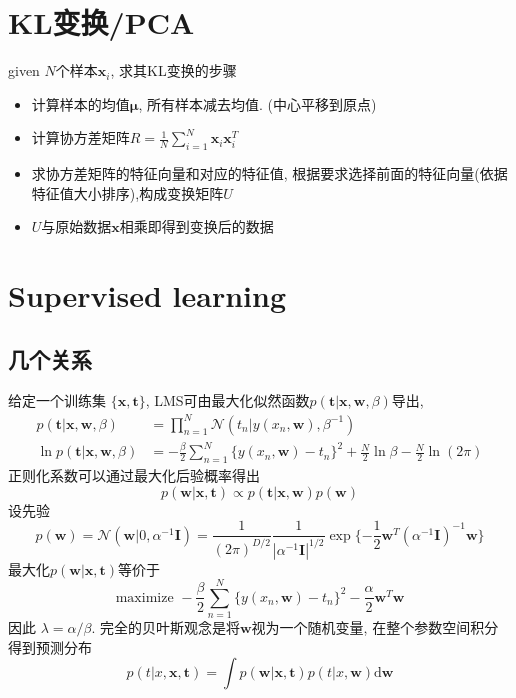 \documentclass[12pt,letterpaper]{article}
\begin{document}
\section{KL变换/PCA}
given $N$个样本$\bm{x}_i$, 求其KL变换的步骤
\begin{itemize}
	\item 计算样本的均值$\bm{\mu}$, 所有样本减去均值. (中心平移到原点)
	\item 计算协方差矩阵$R = \frac{1}{N} \sum_{i=1}^{N} \bm{x}_i\bm{x}_i^T$
	\item 求协方差矩阵的特征向量和对应的特征值, 根据要求选择前面的特征向量(依据特征值大小排序),构成变换矩阵$U$
	\item $U$与原始数据$\bm{x}$相乘即得到变换后的数据
\end{itemize}
\section{Supervised learning}
\subsection{几个关系}
 给定一个训练集 $\{\bm{x}, \bm{t} \}$,
  LMS可由最大化似然函数$p(\bm{t}|\bm{x},\bm{w},\beta)$导出,
  \[ \begin{split} 
	 p(\bm{t}|\bm{x},\bm{w},\beta) &= \prod_{n=1}^{N} \mathcal{N}(t_n|y(x_n, \bm{w}), \beta^{-1})  \\
	 \ln p(\bm{t}|\bm{x},\bm{w},\beta) &= -\frac{\beta}{2}\sum_{n=1}^{N}\{y(x_n, \bm{w})	- t_n\}^2 + \frac{N}{2}\ln\beta - \frac{N}{2}\ln(2\pi)
	 \end{split} 
  \]
 正则化系数可以通过最大化后验概率得出
 \[
	 p(\bm{w}|\bm{x},\bm{t}) \propto p(\bm{t}|\bm{x},\bm{w}) p(\bm{w})
 \]	
设先验
\[
	p(\bm{w}) = \mathcal{N}(\bm{w}|0, \alpha^{-1}\bm{I} )
	= \frac{1}{ (2\pi)^{D/2} } \frac{1}{|\alpha^{-1}\bm{I}|^{1/2} }\exp\{	-\frac{1}{2}\bm{w}^T(\alpha^{-1}\bm{I})^{-1}\bm{w}	\}
\]	
最大化$p(\bm{w}|\bm{x},\bm{t})$等价于
\[
	\text{maximize } -\frac{\beta}{2}\sum_{n=1}^{N}\{y(x_n, \bm{w})	- t_n\}^2 -\frac{\alpha}{2} \bm{w}^T\bm{w}
\]
因此 $\lambda = \alpha/\beta$.
完全的贝叶斯观念是将$\bm{w}$视为一个随机变量, 在整个参数空间积分得到预测分布
\[
	p(t|x, \bm{x},\bm{t}) = \int p(\bm{w}|\bm{x},\bm{t}) p(t|x, \bm{w})\mathrm{d}\bm{w}
\]
\end{document}
